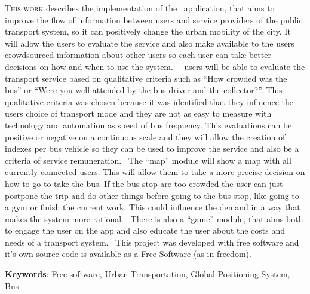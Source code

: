 \lettrine{T}{his work} describes the implementation of the \trilhasp~application, that aims to improve the flow of information between users and service providers of the public transport system, so it can positively change the urban mobility of the city. It will allow the users to evaluate the service and also make available to the users crowdsourced information about other users so each user can take better decisions on how and when to use the system.%
%
~\trilhasp~users will be able to evaluate the transport service based on qualitative criteria such as ``How crowded was the bus'' or ``Were you well attended by the bus driver and the collector?''. This qualitative criteria was chosen because it was identified that they influence the users choice of transport mode and they are not as easy to measure with technology and automation as speed of bus frequency. This evaluations can be positive or negative on a continuous scale and they will allow the creation of indexes per bus vehicle so they can be used to improve the service and also be a criteria of service remuneration.%
%
~The ``map'' module will show a map with all currently connected users. This will allow them to take a more precise decision on how to go to take the bus. If the bus stop are too crowded the user can just postpone the trip and do other things before going to the bus stop, like going to a gym or finish the current work. This could influence the demand in a way that makes the system more rational.%
%
~There is also a ``game'' module, that aims both to engage the user on the app and also educate the user about the costs and needs of a transport system.%
%
~This project was developed with free software and it's own source code is available as a Free Software (as in freedom).

\vspace{\onelineskip}

\vfill

\noindent

\textbf{Keywords}: Free software, Urban Transportation, Global Positioning System, Bus